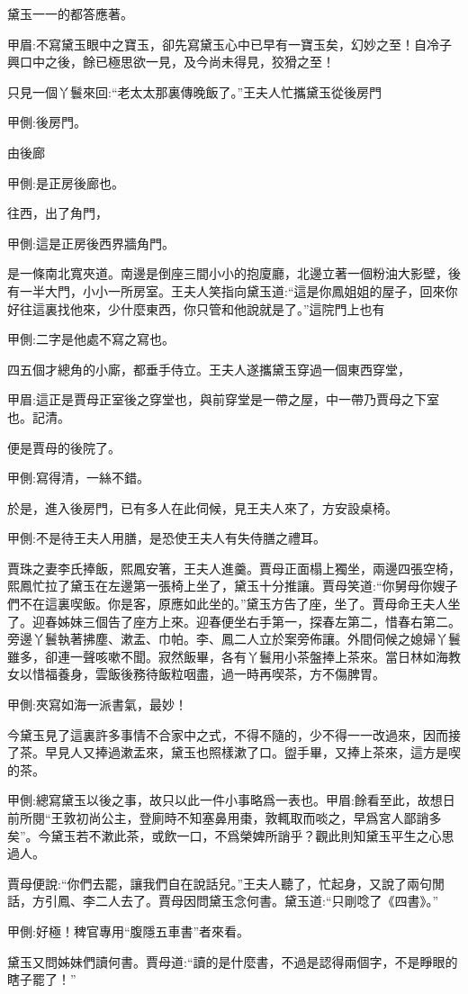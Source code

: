 \begin{parag}
    黛玉一一的都答應著。\begin{note}甲眉:不寫黛玉眼中之寶玉，卻先寫黛玉心中已早有一寶玉矣，幻妙之至！自冷子興口中之後，餘已極思欲一見，及今尚未得見，狡猾之至！\end{note}只見一個丫鬟來回:“老太太那裏傳晚飯了。”王夫人忙攜黛玉從後房門\begin{note}甲側:後房門。\end{note}由後廊\begin{note}甲側:是正房後廊也。\end{note}往西，出了角門，\begin{note}甲側:這是正房後西界牆角門。\end{note}是一條南北寬夾道。南邊是倒座三間小小的抱廈廳，北邊立著一個粉油大影壁，後有一半大門，小小一所房室。王夫人笑指向黛玉道:“這是你鳳姐姐的屋子，回來你好往這裏找他來，少什麼東西，你只管和他說就是了。”這院門上也有\begin{note}甲側:二字是他處不寫之寫也。\end{note}四五個才總角的小廝，都垂手侍立。王夫人遂攜黛玉穿過一個東西穿堂，\begin{note}甲眉:這正是賈母正室後之穿堂也，與前穿堂是一帶之屋，中一帶乃賈母之下室也。記清。\end{note}便是賈母的後院了。\begin{note}甲側:寫得清，一絲不錯。\end{note}於是，進入後房門，已有多人在此伺候，見王夫人來了，方安設桌椅。\begin{note}甲側:不是待王夫人用膳，是恐使王夫人有失侍膳之禮耳。\end{note}賈珠之妻李氏捧飯，熙鳳安箸，王夫人進羹。賈母正面榻上獨坐，兩邊四張空椅，熙鳳忙拉了黛玉在左邊第一張椅上坐了，黛玉十分推讓。賈母笑道:“你舅母你嫂子們不在這裏喫飯。你是客，原應如此坐的。”黛玉方告了座，坐了。賈母命王夫人坐了。迎春姊妹三個告了座方上來。迎春便坐右手第一，探春左第二，惜春右第二。旁邊丫鬟執著拂塵、漱盂、巾帕。李、鳳二人立於案旁佈讓。外間伺候之媳婦丫鬟雖多，卻連一聲咳嗽不聞。寂然飯畢，各有丫鬟用小茶盤捧上茶來。當日林如海教女以惜福養身，雲飯後務待飯粒咽盡，過一時再喫茶，方不傷脾胃。\begin{note}甲側:夾寫如海一派書氣，最妙！\end{note}今黛玉見了這裏許多事情不合家中之式，不得不隨的，少不得一一改過來，因而接了茶。早見人又捧過漱盂來，黛玉也照樣漱了口。盥手畢，又捧上茶來，這方是喫的茶。\begin{note}甲側:總寫黛玉以後之事，故只以此一件小事略爲一表也。甲眉:餘看至此，故想日前所閱“王敦初尚公主，登廁時不知塞鼻用棗，敦輒取而啖之，早爲宮人鄙誚多矣”。今黛玉若不漱此茶，或飲一口，不爲榮婢所誚乎？觀此則知黛玉平生之心思過人。\end{note}賈母便說:“你們去罷，讓我們自在說話兒。”王夫人聽了，忙起身，又說了兩句閒話，方引鳳、李二人去了。賈母因問黛玉念何書。黛玉道:“只剛唸了《四書》。”\begin{note}甲側:好極！稗官專用“腹隱五車書”者來看。\end{note}黛玉又問姊妹們讀何書。賈母道:“讀的是什麼書，不過是認得兩個字，不是睜眼的瞎子罷了！”
\end{parag}


